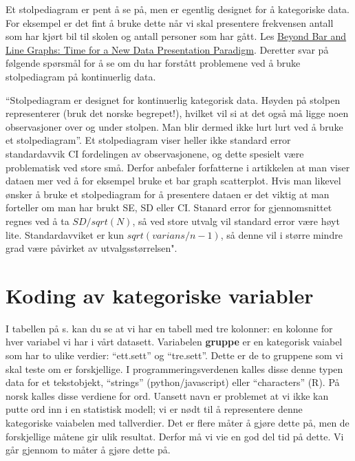 \documentclass[
]{book}
\begin{document}
Et stolpediagram er pent å se på, men er egentlig designet for å kategoriske data. For eksempel er det fint å bruke dette når vi skal presentere frekvensen antall som har kjørt bil til skolen og antall personer som har gått. Les \href{https://journals.plos.org/plosbiology/article?id=10.1371/journal.pbio.1002128}{Beyond Bar and Line Graphs: Time for a New Data Presentation Paradigm}. Deretter svar på følgende spørsmål for å se om du har forstått problemene ved å bruke stolpediagram på kontinuerlig data.

``Stolpediagram er designet for kontinuerlig kategorisk data. Høyden på stolpen representerer (bruk det norske begrepet!), hvilket vil si at det også må ligge noen observasjoner over og under stolpen. Man blir dermed ikke lurt lurt ved å bruke et stolpediagram''. Et stolpediagram viser heller ikke standard error standardavvik CI fordelingen av observasjonene, og dette spesielt være problematisk ved store små. Derfor anbefaler forfatterne i artikkelen at man viser dataen mer ved å for eksempel bruke et bar graph scatterplot. Hvis man likevel ønsker å bruke et stolpediagram for å presentere dataen er det viktig at man forteller om man har brukt SE, SD eller CI. Stanard error for gjennomsnittet regnes ved å ta \(SD/sqrt(N)\), så ved store utvalg vil standard error være høyt lite. Standardavviket er kun \(sqrt(varians/n-1)\), så denne vil i større mindre grad være påvirket av utvalgsstørrelsen".

\hypertarget{koding-av-kategoriske-variabler}{%
\chapter{Koding av kategoriske variabler}\label{koding-av-kategoriske-variabler}}

I tabellen på s. kan du se at vi har en tabell med tre kolonner: en kolonne for hver variabel vi har i vårt datasett. Variabelen \textbf{gruppe} er en kategorisk vaiabel som har to ulike verdier: ``ett.sett'' og ``tre.sett''. Dette er de to gruppene som vi skal teste om er forskjellige. I programmeringsverdenen kalles disse denne typen data for et tekstobjekt, ``strings'' (python/javascript) eller ``characters'' (R). På norsk kalles disse verdiene for ord. Uansett navn er problemet at vi ikke kan putte ord inn i en statistisk modell; vi er nødt til å representere denne kategoriske vaiabelen med tallverdier. Det er flere måter å gjøre dette på, men de forskjellige måtene gir ulik resultat. Derfor må vi vie en god del tid på dette. Vi går gjennom to måter å gjøre dette på.
\end{document}
